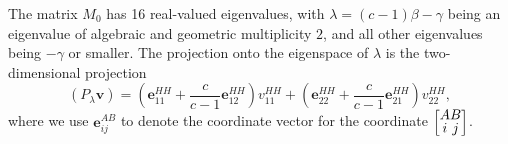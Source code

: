 \documentclass[11pt]{article}
\begin{document}
\begin{lemma}
\label{lem:matrix_eigenvalues}
The matrix $M_0$ has 16 real-valued eigenvalues, with   $\lambda=(c-1)\beta-\gamma$ being an eigenvalue of algebraic and geometric multiplicity $2$, and all other eigenvalues being $-\gamma$ or smaller.  The projection onto the eigenspace of $\lambda$ is the two-dimensional projection
  $$
  (P_\lambda\mathbf v)=
  \left(\mathbf e_{11}^{HH}+\frac c{c-1}\mathbf e_{12}^{HH}\right)v_{11}^{HH}+
 \left(\mathbf e_{22}^{HH}+\frac c{c-1}\mathbf e_{21}^{HH}\right)v_{22}^{HH},
  $$
  where  we use $\mathbf e_{ij}^{AB}$ to denote the coordinate vector for the coordinate 
\(
\renewcommand{\arraystretch}{0.7}
\left[
\begin{array}{@{}c@{}c@{}c@{}c@{}}
A & B\\
i & j
\end{array}
\right]
\).
\end{lemma}
\end{document}
